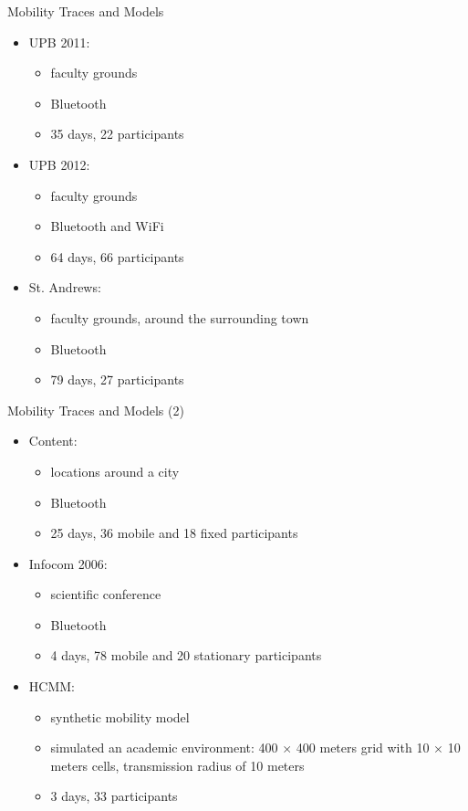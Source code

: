 \documentclass{beamer}
\begin{document}
\begin{frame}{Mobility Traces and Models}
	\begin{itemize}
		\item UPB 2011:
		\begin{itemize}
			\item faculty grounds
			\item Bluetooth
			\item 35 days, 22 participants
		\end{itemize}
		\vskip3pt
		\item UPB 2012:
		\begin{itemize}
			\item faculty grounds
			\item Bluetooth and WiFi
			\item 64 days, 66 participants
		\end{itemize}
		\vskip3pt
		\item St. Andrews:
		\begin{itemize}
			\item faculty grounds, around the surrounding town
			\item Bluetooth
			\item 79 days, 27 participants
		\end{itemize}
	\end{itemize}
\end{frame}

\begin{frame}{Mobility Traces and Models (2)}
	\begin{itemize}
		\item Content:
		\begin{itemize}
			\item locations around a city
			\item Bluetooth
			\item 25 days, 36 mobile and 18 fixed participants
		\end{itemize}
		\vskip3pt
		\item Infocom 2006:
		\begin{itemize}
			\item scientific conference
			\item Bluetooth
			\item 4 days, 78 mobile and 20 stationary participants
		\end{itemize}
		\vskip3pt
		\item HCMM:
		\begin{itemize}
			\item synthetic mobility model
			\item simulated an academic environment: 400 $\times$ 400 meters grid with 10 $\times$ 10 meters cells, transmission radius of 10 meters
			\item 3 days, 33 participants
		\end{itemize}
	\end{itemize}
\end{frame}
\end{document}
